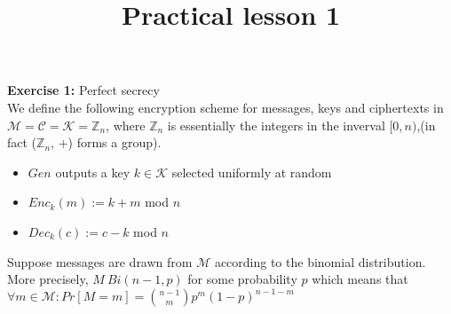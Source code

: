 \documentclass[12pt]{article}
\title{Practical lesson 1}
\begin{document}
\maketitle

\textbf{Exercise 1:} Perfect secrecy\\
We define the following encryption scheme for messages, keys and ciphertexts in $\mathcal{M}=\mathcal{C}=\mathcal{K}=\mathbb{Z}_n$, where $\mathbb{Z}_n$ is essentially the integers in the inverval $[0,n)$,(in fact ($\mathbb{Z}_n$, +) forms a group).
\begin{itemize}
\item $Gen$ outputs a key $k \in \mathcal{K}$ selected uniformly at random
\item $Enc_k(m):=k+m$ mod $n$
\item $Dec_k(c):=c-k$ mod $n$
\end{itemize}
Suppose messages are drawn from $\mathcal{M}$ according to the binomial distribution. More precisely, $M ~ Bi(n-1,p)$ for some probability $p$ which means that $\forall m \in \mathcal{M}:Pr[M=m]=\binom{n-1}{m}p^m(1-p)^{n-1-m}$
\end{document}

